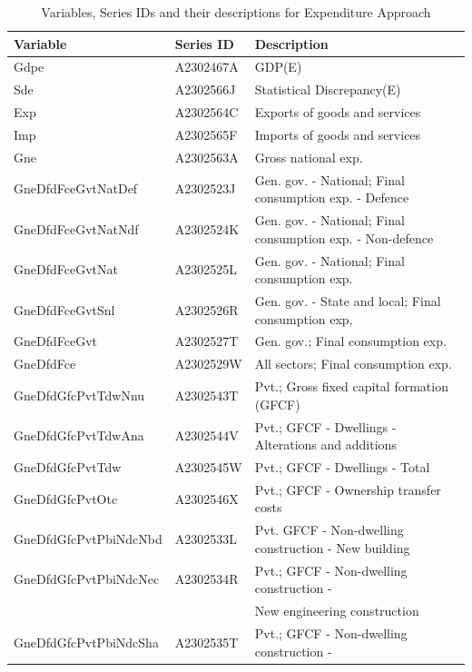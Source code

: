 \documentclass[a4paper, 11pt]{article}
\begin{document}
\begin{table}
	\caption{Variables, Series IDs and their descriptions for Expenditure Approach}
	\small
	\centering
	\begin{tabular*}{\columnwidth}[width = \textwidth]{lll}
		\toprule
		\textbf{Variable} & \textbf{Series ID} & \textbf{Description}\\
		\midrule
		Gdpe                  & A2302467A & GDP(E)\\
		Sde                   & A2302566J & Statistical Discrepancy(E)\\
		Exp                   & A2302564C & Exports of goods and services\\
		Imp                   & A2302565F & Imports of goods and services\\
		Gne                   & A2302563A & Gross national exp.\\
		\addlinespace
		GneDfdFceGvtNatDef    & A2302523J & Gen. gov. - National; Final consumption exp. - Defence\\
		GneDfdFceGvtNatNdf    & A2302524K & Gen. gov. - National; Final consumption exp. - Non-defence\\
		GneDfdFceGvtNat       & A2302525L & Gen. gov. - National; Final consumption exp.\\
		GneDfdFceGvtSnl       & A2302526R & Gen. gov. - State and local; Final consumption exp,\\
		GneDfdFceGvt          & A2302527T & Gen. gov.; Final consumption exp.\\
		\addlinespace
		GneDfdFce             & A2302529W & All sectors; Final consumption exp.\\
		GneDfdGfcPvtTdwNnu    & A2302543T & Pvt.; Gross fixed capital formation (GFCF)\\
		GneDfdGfcPvtTdwAna    & A2302544V & Pvt.; GFCF - Dwellings - Alterations and additions\\
		GneDfdGfcPvtTdw       & A2302545W & Pvt.; GFCF - Dwellings - Total\\
		GneDfdGfcPvtOtc       & A2302546X & Pvt.; GFCF - Ownership transfer costs\\
		\addlinespace
		GneDfdGfcPvtPbiNdcNbd & A2302533L & Pvt. GFCF - Non-dwelling construction - New building\\
		GneDfdGfcPvtPbiNdcNec & A2302534R & Pvt.; GFCF - Non-dwelling construction -\\
		&           & New engineering construction\\
		GneDfdGfcPvtPbiNdcSha & A2302535T & Pvt.; GFCF - Non-dwelling construction -\\

\end{tabular*}
\end{table}
\end{document}
